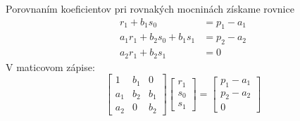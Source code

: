 \documentclass[a4paper, 10pt, ]{article}
\begin{document}
Porovnaním koeficientov pri rovnakých mocninách získame rovnice
\begin{subequations}
	\begin{align}
		 r_1 + b_1 s_0  &= p_1 - a_1 \\
		 a_1 r_1 + b_2 s_0 + b_1 s_1  &= p_2 -  a_2 \\
		 a_2 r_1  + b_2 s_1  &= 0
	\end{align}
\end{subequations}
V maticovom zápise:
\begin{equation}
	\begin{bmatrix} 1 & b_1 & 0 \\ a_1 & b_2 & b_1 \\ a_2 &   0 & b_2 \end{bmatrix}
	\begin{bmatrix} r_1 \\ s_0 \\ s_1  \end{bmatrix}
	=
	\begin{bmatrix} p_1 - a_1 \\ p_2 - a_2 \\ 0 \end{bmatrix}
\end{equation}
\end{document}
